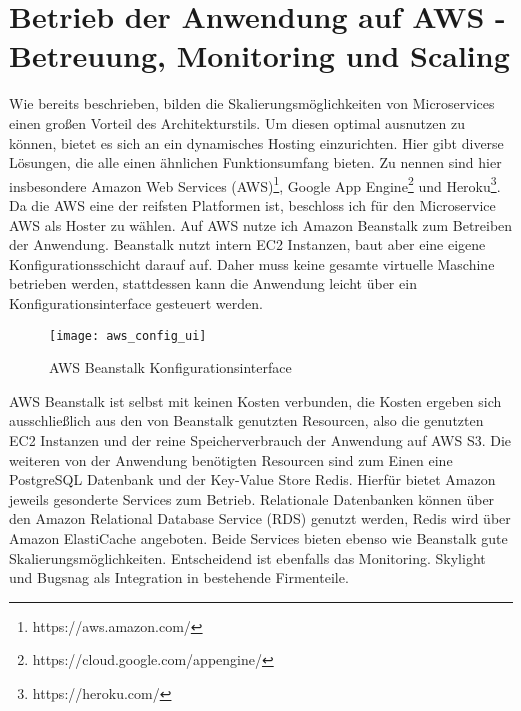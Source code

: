 \section{Betrieb der Anwendung auf AWS - Betreuung, Monitoring und Scaling}
Wie bereits beschrieben, bilden die Skalierungsmöglichkeiten von Microservices einen großen Vorteil des Architekturstils. Um diesen optimal ausnutzen zu können, bietet es sich an ein dynamisches Hosting einzurichten. Hier gibt diverse Lösungen, die alle einen ähnlichen Funktionsumfang bieten. Zu nennen sind hier insbesondere Amazon Web Services (AWS)\footnote{https://aws.amazon.com/}, Google App Engine\footnote{https://cloud.google.com/appengine/} und Heroku\footnote{https://heroku.com/}. Da die AWS eine der reifsten Platformen ist, beschloss ich für den Microservice AWS als Hoster zu wählen.
Auf AWS nutze ich Amazon Beanstalk zum Betreiben der Anwendung. Beanstalk nutzt intern EC2 Instanzen, baut aber eine eigene Konfigurationsschicht darauf auf. Daher muss keine gesamte virtuelle Maschine betrieben werden, stattdessen kann die Anwendung leicht über ein Konfigurationsinterface gesteuert werden.

\begin{figure}[h]
    \centering
    \caption{AWS Beanstalk Konfigurationsinterface}
    \texttt{[image: aws\_config\_ui]}
\end{figure}
AWS Beanstalk ist selbst mit keinen Kosten verbunden, die Kosten ergeben sich ausschließlich aus den von Beanstalk genutzten Resourcen, also die genutzten EC2 Instanzen und der reine Speicherverbrauch der Anwendung auf AWS S3. Die weiteren von der Anwendung benötigten Resourcen sind zum Einen eine PostgreSQL Datenbank und der Key-Value Store Redis. Hierfür bietet Amazon jeweils gesonderte Services zum Betrieb. Relationale Datenbanken können über den Amazon Relational Database Service (RDS) genutzt werden, Redis wird über Amazon ElastiCache angeboten. Beide Services bieten ebenso wie Beanstalk gute Skalierungsmöglichkeiten.
Entscheidend ist ebenfalls das Monitoring. Skylight und Bugsnag als Integration in bestehende Firmenteile.